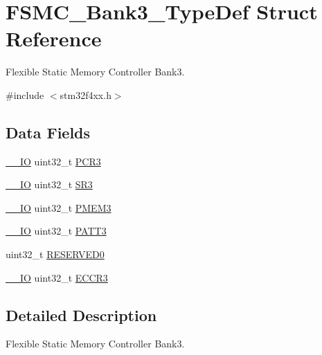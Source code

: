 \hypertarget{struct_f_s_m_c___bank3___type_def}{\section{F\-S\-M\-C\-\_\-\-Bank3\-\_\-\-Type\-Def Struct Reference}
\label{struct_f_s_m_c___bank3___type_def}
}


Flexible Static Memory Controller Bank3.  




{\ttfamily \#include $<$stm32f4xx.\-h$>$}

\subsection*{Data Fields}
\begin{DoxyCompactItemize}
\item 
\hyperlink{group___c_m_s_i_s__core__definitions_gaec43007d9998a0a0e01faede4133d6be}{\-\_\-\-\_\-\-I\-O} uint32\-\_\-t \hyperlink{struct_f_s_m_c___bank3___type_def_a73861fa74b83973fa1b5f92735c042ef}{P\-C\-R3}
\item 
\hyperlink{group___c_m_s_i_s__core__definitions_gaec43007d9998a0a0e01faede4133d6be}{\-\_\-\-\_\-\-I\-O} uint32\-\_\-t \hyperlink{struct_f_s_m_c___bank3___type_def_af30c34f7c606cb9416a413ec5fa36491}{S\-R3}
\item 
\hyperlink{group___c_m_s_i_s__core__definitions_gaec43007d9998a0a0e01faede4133d6be}{\-\_\-\-\_\-\-I\-O} uint32\-\_\-t \hyperlink{struct_f_s_m_c___bank3___type_def_aba8981e4f06cfb3db7d9959242052f80}{P\-M\-E\-M3}
\item 
\hyperlink{group___c_m_s_i_s__core__definitions_gaec43007d9998a0a0e01faede4133d6be}{\-\_\-\-\_\-\-I\-O} uint32\-\_\-t \hyperlink{struct_f_s_m_c___bank3___type_def_aba03fea9c1bb2242d963e29f1b94d25e}{P\-A\-T\-T3}
\item 
uint32\-\_\-t \hyperlink{struct_f_s_m_c___bank3___type_def_af86c61a5d38a4fc9cef942a12744486b}{R\-E\-S\-E\-R\-V\-E\-D0}
\item 
\hyperlink{group___c_m_s_i_s__core__definitions_gaec43007d9998a0a0e01faede4133d6be}{\-\_\-\-\_\-\-I\-O} uint32\-\_\-t \hyperlink{struct_f_s_m_c___bank3___type_def_a6062be7dc144c07e01c303cb49d69ce2}{E\-C\-C\-R3}
\end{DoxyCompactItemize}


\subsection{Detailed Description}
Flexible Static Memory Controller Bank3. 

